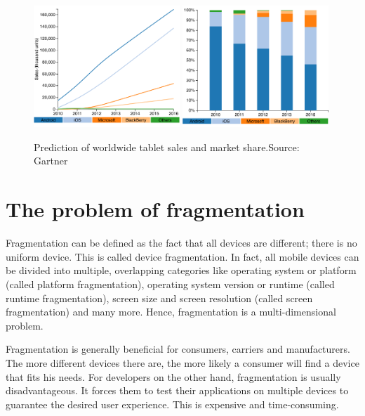 \begin{figure}[h!]
    \begin{center}
        \includegraphics[width=0.49\textwidth]{figs/tablet_sales.pdf}
        \includegraphics[width=0.49\textwidth]{figs/tablet_share.pdf}
        \caption{Prediction of worldwide tablet sales and market share.\newline Source: Gartner \citeGartnerTab
        }
        \label{fig:tablet}
    \end{center}
\end{figure}

\section{The problem of fragmentation}

Fragmentation can be defined as the fact that all devices are different; there is no uniform device. This is called device fragmentation. In fact, all mobile devices can be divided into multiple, overlapping categories like operating system or platform (called platform fragmentation), operating system version or runtime (called runtime fragmentation), screen size and screen resolution (called screen fragmentation) and many more. Hence, fragmentation is a multi-dimensional problem. 

Fragmentation is generally beneficial for consumers, carriers and manufacturers. The more different devices there are, the more likely a consumer will find a device that fits his needs. For developers on the other hand, fragmentation is usually disadvantageous. It forces them to test their applications on multiple devices to guarantee the desired user experience. This is expensive and time-consuming. 


